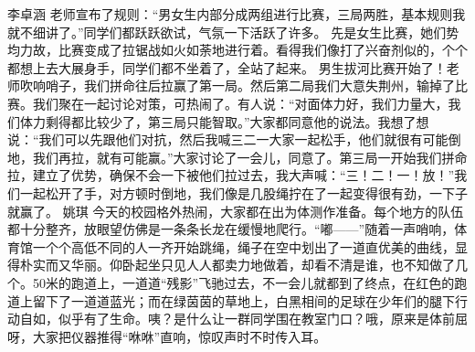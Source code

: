 {}\markdownRendererInterblockSeparator
{}李卓涵\markdownRendererInterblockSeparator
{}老师宣布了规则：“男女生内部分成两组进行比赛，三局两胜，基本规则我就不细讲了。”同学们都跃跃欲试，气氛一下活跃了许多。\markdownRendererInterblockSeparator
{}先是女生比赛，她们势均力故，比赛变成了拉锯战如火如荼地进行着。看得我们像打了兴奋剂似的，个个都想上去大展身手，同学们都不坐着了，全站了起来。\markdownRendererInterblockSeparator
{}男生拔河比赛开始了！老师吹响哨子，我们拼命往后拉赢了第一局。然后第二局我们大意失荆州，输掉了比赛。我们聚在一起讨论对策，可热闹了。有人说：“对面体力好，我们力量大，我们体力剩得都比较少了，第三局只能智取。”大家都同意他的说法。我想了想说：“我们可以先跟他们对抗，然后我喊三二一大家一起松手，他们就很有可能倒地，我们再拉，就有可能赢。”大家讨论了一会儿，同意了。第三局一开始我们拼命拉，建立了优势，确保不会一下被他们拉过去，我大声喊：“三！二！一！放！”我们一起松开了手，对方顿时倒地，我们像是几股绳拧在了一起变得很有劲，一下子就赢了。\markdownRendererInterblockSeparator
{}\markdownRendererInterblockSeparator
{}姚琪\markdownRendererInterblockSeparator
{}今天的校园格外热闹，大家都在出为体测作准备。每个地方的队伍都十分整齐，放眼望仿佛是一条条长龙在缓慢地爬行。“嘟——”随着一声哨响，体育馆一个个高低不同的人一齐开始跳绳，绳子在空中划出了一道直优美的曲线，显得朴实而又华丽。仰卧起坐只见人人都卖力地做着，却看不清是谁，也不知做了几个。50米的跑道上，一道道“残影”飞驰过去，不一会儿就都到了终点，在红色的跑道上留下了一道道蓝光；而在绿茵茵的草地上，白黑相间的足球在少年们的腿下行动自如，似乎有了生命。咦？是什么让一群同学围在教室门口？哦，原来是体前屈呀，大家把仪器推得“咻咻”直响，惊叹声时不时传入耳。\markdownRendererDocumentEnd